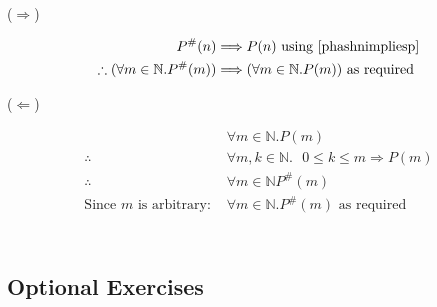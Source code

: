 \documentclass[10pt,\jkfside,a4paper]{article}
\begin{document}
\begin{enumerate}
\begin{enumerate}
\begin{itemize}
\begin{center}
($\Longrightarrow$)

\begin{equation}
\begin{split}
P^\#(n) &\Longrightarrow P(n)\text{ using \ref{phashnimpliesp}}\\
\therefore (\forall m \in \mathbb{N}. P^\#(m)) &\Longrightarrow (\forall m \in \mathbb{N}. P(m)) \text{ as required}\\
\end{split}
\end{equation}

($\Longleftarrow$)

\begin{equation}
\begin{split}
&\forall m \in\mathbb{N}.P(m)\\
\therefore\text{ } &\forall m, k \in \mathbb{N}.\text{ } 0 \leqslant k \leqslant m \Longrightarrow P(m)\\
\therefore\text{ } & \forall m \in \mathbb{N} P^\#(m)\\
\text{Since $m$ is arbitrary: }&\forall m \in \mathbb{N}. P^\#(m)\text{ as required}\\
\end{split}
\end{equation}

\begin{equation}
\begin{split}
\end{split}
\end{equation}

\end{center}

\end{itemize}

\end{enumerate}

\end{enumerate}

\subsection{Optional Exercises}
\end{document}

